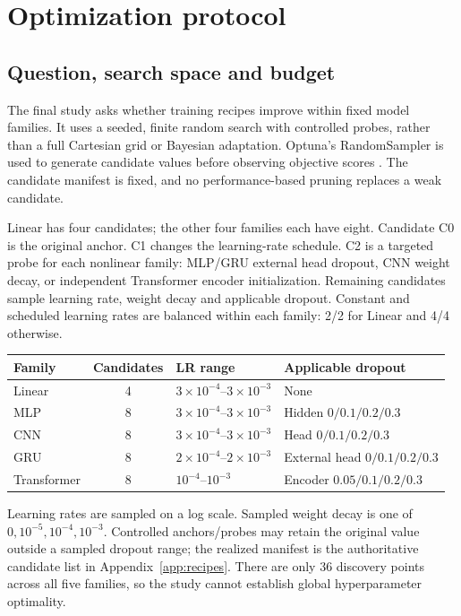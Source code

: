 \clearpage
\section{Optimization protocol}
\subsection{Question, search space and budget}
The final study asks whether training recipes improve within fixed model families. It uses a seeded, finite random search with controlled probes, rather than a full Cartesian grid or Bayesian adaptation. Optuna's RandomSampler is used to generate candidate values before observing objective scores \cite{optuna}. The candidate manifest is fixed, and no performance-based pruning replaces a weak candidate.

Linear has four candidates; the other four families each have eight. Candidate C0 is the original anchor. C1 changes the learning-rate schedule. C2 is a targeted probe for each nonlinear family: MLP/GRU external head dropout, CNN weight decay, or independent Transformer encoder initialization. Remaining candidates sample learning rate, weight decay and applicable dropout. Constant and scheduled learning rates are balanced within each family: 2/2 for Linear and 4/4 otherwise.

\begin{center}
\small
\begin{tabular}{lcll}
\toprule
Family & Candidates & LR range & Applicable dropout \\
\midrule
Linear & 4 & $3\times10^{-4}$--$3\times10^{-3}$ & None \\
MLP & 8 & $3\times10^{-4}$--$3\times10^{-3}$ & Hidden $0/0.1/0.2/0.3$ \\
CNN & 8 & $3\times10^{-4}$--$3\times10^{-3}$ & Head $0/0.1/0.2/0.3$ \\
GRU & 8 & $2\times10^{-4}$--$2\times10^{-3}$ & External head $0/0.1/0.2/0.3$ \\
Transformer & 8 & $10^{-4}$--$10^{-3}$ & Encoder $0.05/0.1/0.2/0.3$ \\
\bottomrule
\end{tabular}
\end{center}
Learning rates are sampled on a log scale. Sampled weight decay is one of $0,10^{-5},10^{-4},10^{-3}$. Controlled anchors/probes may retain the original value outside a sampled dropout range; the realized manifest is the authoritative candidate list in Appendix\ \ref{app:recipes}. There are only 36 discovery points across all five families, so the study cannot establish global hyperparameter optimality.

